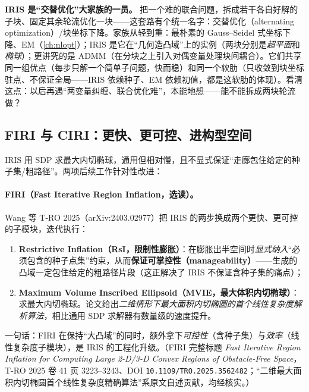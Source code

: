 \begin{insight}
\textbf{IRIS 是“交替优化”大家族的一员。}\;
把一个难的联合问题，拆成若干各自好解的子块、固定其余轮流优化一块——这套路有个统一名字：交替优化（alternating optimization）/块坐标下降。家族从轻到重：最朴素的 Gauss--Seidel 式坐标下降、EM（\cref{ch:nlopt}）；IRIS 是它在“几何造凸域”上的实例（两块分别是\emph{超平面}和\emph{椭球}）；更讲究的是 ADMM（在分块之上引入对偶变量处理块间耦合）。它们共享同一组优点（每步只解一个简单子问题，快而稳）和同一个软肋（只收敛到块坐标驻点、不保证全局——IRIS 依赖种子、EM 依赖初值，都是这软肋的体现）。看清这点：以后再遇“两变量纠缠、联合优化难”，本能地想——能不能拆成两块轮流做？
\end{insight}

\subsection{FIRI 与 CIRI：更快、更可控、进构型空间}
\label{sec:stc-firi-ciri}

IRIS 用 SDP 求最大内切椭球，通用但相对慢，且不显式保证“走廊包住给定的种子集/粗路径”。两项后续工作针对性改进：

\paragraph{FIRI（Fast Iterative Region Inflation，选读）。}
Wang 等 T-RO 2025\cite{wang2025firi}（arXiv:2403.02977）把 IRIS 的两步换成两个更快、更可控的子模块，迭代执行：
\begin{enumerate}
  \item \textbf{Restrictive Inflation（RsI，限制性膨胀）}：在膨胀出半空间时\emph{显式纳入}“必须包含的种子点集”约束，从而\textbf{保证可掌控性（manageability）}——生成的凸域一定包住给定的粗路径片段（这正解决了 IRIS 不保证含种子集的痛点）；
  \item \textbf{Maximum Volume Inscribed Ellipsoid（MVIE，最大体积内切椭球）}：求最大内切椭球。论文给出\emph{二维情形下最大面积内切椭圆的首个线性复杂度解析算法}，相比通用 SDP 求解器有数量级的速度提升。
\end{enumerate}
一句话：FIRI 在保持“大凸域”的同时，额外拿下\emph{可控性}（含种子集）与\emph{效率}（线性复杂度子模块），是 IRIS 的工程化升级。（FIRI 完整标题 \emph{Fast Iterative Region Inflation for Computing Large 2-D/3-D Convex Regions of Obstacle-Free Space}，T-RO 2025 卷 41 页 3223--3243、DOI \texttt{10.1109/\allowbreak TRO.2025.3562482}；“二维最大面积内切椭圆首个线性复杂度精确算法”系原文自述贡献，均经核实。）


